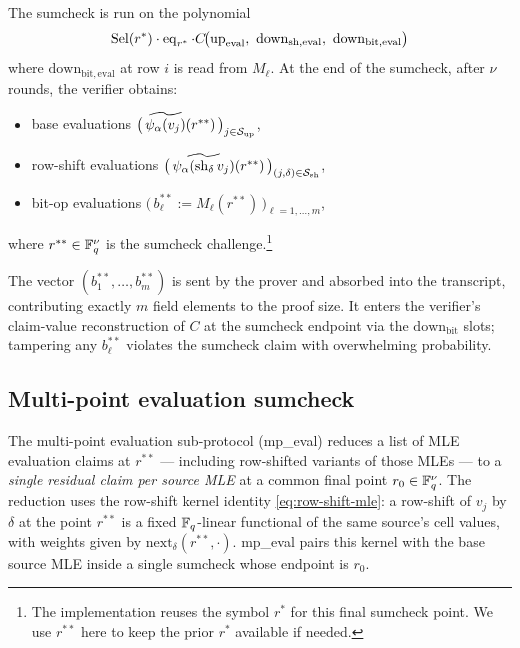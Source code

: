 The sumcheck is run on the polynomial
\[
  \mathrm{Sel}(r^*)\cdot \operatorname{eq}_{r^*} \cdot
  C\!\big(\mathrm{up}_{\mathrm{eval}},\ \mathrm{down}_{\mathrm{sh, eval}},\ \mathrm{down}_{\mathrm{bit, eval}}\big)
\]
where $\mathrm{down}_{\mathrm{bit, eval}}$ at row $i$ is read from
$M_{\ell}$. At the end of the sumcheck, after $\nu$ rounds, the
verifier obtains:
\begin{itemize}[leftmargin=2em]
  \item base evaluations $\big(\,\widetilde{\psi_{\alpha}(v_j)}(r^{**})\,\big)_{j \in \mathcal{S}_{\mathrm{up}}}$,
  \item row-shift evaluations $\big(\,\widetilde{\psi_{\alpha}(\mathrm{sh}_{\delta}\,v_j)}(r^{**})\,\big)_{(j,\delta) \in \mathcal{S}_{\mathrm{sh}}}$,
  \item bit-op evaluations $\big(\,b_{\ell}^{**} := M_{\ell}(r^{**})\,\big)_{\ell = 1,\ldots,m}$,
\end{itemize}
where $r^{**} \in \mathbb{F}_q^{\nu}$ is the sumcheck challenge.\footnote{The
implementation reuses the symbol $r^*$ for this final sumcheck point.
We use $r^{**}$ here to keep the prior $r^*$ available if needed.}

The vector $(b_1^{**},\ldots,b_m^{**})$ is sent by the prover and
absorbed into the transcript, contributing exactly $m$ field elements
to the proof size. It enters the verifier's claim-value reconstruction
of $C$ at the sumcheck endpoint via the $\mathrm{down}_{\mathrm{bit}}$
slots; tampering any $b_{\ell}^{**}$ violates the sumcheck claim with
overwhelming probability.

\subsection{Multi-point evaluation sumcheck}
\label{sec:mpeval}

The multi-point evaluation sub-protocol (mp\_eval) reduces a list of
MLE evaluation claims at $r^{**}$ — including row-shifted variants of
those MLEs — to a \emph{single residual claim per source MLE} at a
common final point $r_0 \in \mathbb{F}_q^{\nu}$. The reduction uses the
row-shift kernel identity \cref{eq:row-shift-mle}: a row-shift of
$v_j$ by $\delta$ at the point $r^{**}$ is a fixed $\mathbb{F}_q$-linear
functional of the same source's cell values, with weights given by
$\mathrm{next}_\delta(r^{**}, \cdot)$. mp\_eval pairs this kernel
with the base source MLE inside a single sumcheck whose endpoint is
$r_0$.

